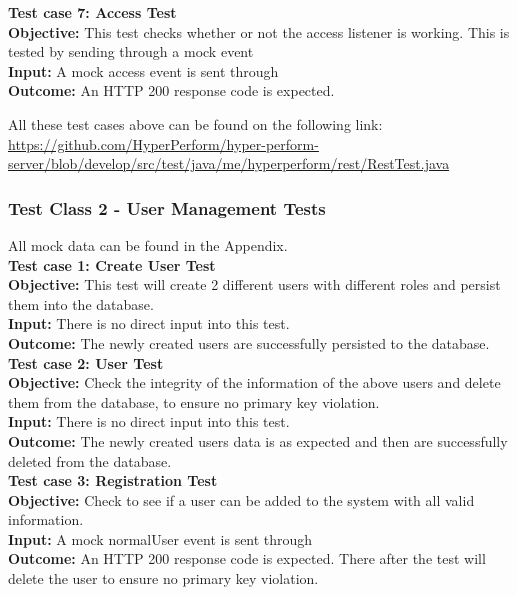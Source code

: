\documentclass[11pt,a4paper]{article}
\begin{document}
\textbf{Test case 7: Access Test}  \\
\textbf{Objective: } This test checks whether or not the access listener is working. This is tested by sending through a mock event \\
\textbf{Input: } A mock access event is sent through \\
\textbf{Outcome: } An HTTP 200 response code is expected. 

All these test cases above can be found on the following link: \url{https://github.com/HyperPerform/hyper-perform-server/blob/develop/src/test/java/me/hyperperform/rest/RestTest.java}


\subsubsection{Test Class 2 - User Management Tests}
All mock data can be found in the Appendix.\\
\textbf{Test case 1: Create User Test} \\
\textbf{Objective: } This test will create 2 different users with different roles and persist them into the database. \\
\textbf{Input: } There is no direct input into this test.\\
\textbf{Outcome: } The newly created users are successfully persisted to the database. \\

\textbf{Test case 2: User Test} \\
\textbf{Objective: } Check the integrity of the information of the above users and delete them from the database, to ensure no primary key violation. \\
\textbf{Input: } There is no direct input into this test.\\
\textbf{Outcome: } The newly created users data is as expected and then are successfully deleted from the database. \\


\textbf{Test case 3: Registration Test} \\
\textbf{Objective: } Check to see if a user can be added to the system with all valid information. \\
\textbf{Input: } A mock normalUser event is sent through\\
\textbf{Outcome: } An HTTP 200 response code is expected. There after the test will delete the user to ensure no primary key violation. \\
\end{document}
